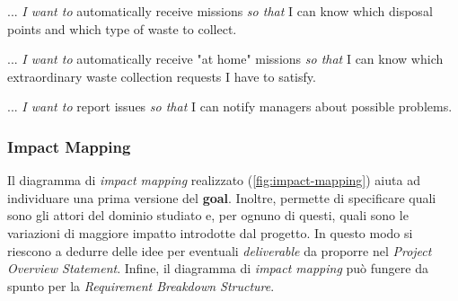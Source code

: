 \begin{story}
    ... \textit{I want to} automatically receive missions \textit{so that} I can know which disposal points and which type of waste to collect.
\end{story}
\begin{story}
    ... \textit{I want to} automatically receive "at home" missions \textit{so that} I can know which extraordinary waste collection requests I have to satisfy.
\end{story}
\begin{story}
    ... \textit{I want to} report issues \textit{so that} I can notify managers about possible problems.
\end{story}



\subsubsection{Impact Mapping}
Il diagramma di \textit{impact mapping} realizzato (\ref{fig:impact-mapping}) aiuta ad individuare una prima versione del \textbf{goal}. Inoltre, permette di specificare quali sono gli attori del dominio studiato e, per ognuno di questi, quali sono le variazioni di maggiore impatto introdotte dal progetto. In questo modo si riescono a dedurre delle idee per eventuali \textit{deliverable} da proporre nel \textit{Project Overview Statement}. Infine, il diagramma di \textit{impact mapping} può fungere da spunto per la \textit{Requirement Breakdown Structure}.